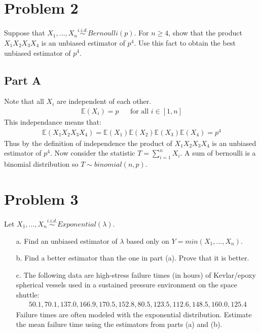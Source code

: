 \documentclass{article}
\begin{document}
\clearpage

\section*{Problem 2}
Suppose that $X_1,...,X_n \overset{i.i.d.}{\sim} Bernoulli(p)$. For $n \geq 4$, show that the product $X_1 X_2 X_3 X_4$ is an unbiased estimator of $p^4$. Use this fact to obtain the best unbiased estimator of $p^4$.

\subsection*{Part A}
Note that all $X_i$ are independent of each other.
\begin{align*}
\mathbb{E}(X_i) = p && \text{for all } i \in [1,n]
\end{align*}
This independance means that:
\begin{align*}
\mathbb{E}(X_1 X_2 X_3 X_4) = \mathbb{E}(X_1)\mathbb{E}(X_2)\mathbb{E}(X_3)\mathbb{E}(X_4) = p^4
\end{align*}
Thus by the definition of independence the product of $X_1 X_2 X_3 X_4$ is an unbiased estimator of $p^4$. Now consider the statistic $T=\sum_{i=1}^{n}X_i$. A sum of bernoulli is a binomial distribution so $T\sim binomial(n,p)$.




\clearpage

\section*{Problem 3}

Let $X_1,...,X_n \overset{i.i.d.}{\sim} Exponential(\lambda)$.
\begin{enumerate}
\item[a.] Find an unbiased estimator of $\lambda$ based only on $Y=min(X_1,...,X_n)$.
\item[b.] Find a better estimator than the one in part (a). Prove that it is better.
\item[c.] The following data are high-stress failure times (in hours) of Kevlar/epoxy spherical vessels used in a sustained pressure environment on the space shuttle:
\begin{align*}
50.1, 70.1, 137.0, 166.9, 170.5, 152.8, 80.5, 123.5, 112.6, 148.5, 160.0, 125.4
\end{align*}
Failure times are often modeled with the exponential distribution. Estimate the mean failure time using the estimators from parts (a) and (b).
\end{enumerate}
\end{document}
